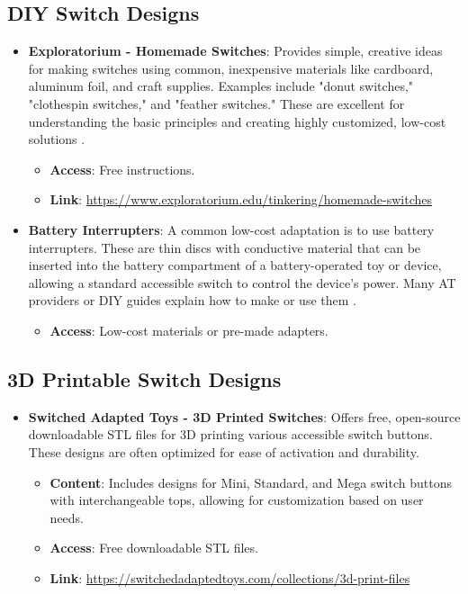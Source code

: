 \subsection{DIY Switch Designs}
\begin{itemize}
    \item \textbf{Exploratorium - Homemade Switches}: Provides simple, creative ideas for making switches using common, inexpensive materials like cardboard, aluminum foil, and craft supplies. Examples include "donut switches," "clothespin switches," and "feather switches." These are excellent for understanding the basic principles and creating highly customized, low-cost solutions  \cite{Exploratorium_Switches}.
    \begin{itemize}
        \item \textbf{Access}: Free instructions.
        \item \textbf{Link}: \url{https://www.exploratorium.edu/tinkering/homemade-switches}
    \end{itemize}
    \item \textbf{Battery Interrupters}: A common low-cost adaptation is to use battery interrupters. These are thin discs with conductive material that can be inserted into the battery compartment of a battery-operated toy or device, allowing a standard accessible switch to control the device's power. Many AT providers or DIY guides explain how to make or use them  \cite{ATKansans_Interrupters}.
    \begin{itemize}
        \item \textbf{Access}: Low-cost materials or pre-made adapters.
    \end{itemize}
\end{itemize}

\subsection{3D Printable Switch Designs}
\begin{itemize}
    \item \textbf{Switched Adapted Toys - 3D Printed Switches}: Offers free, open-source downloadable STL files for 3D printing various accessible switch buttons. These designs are often optimized for ease of activation and durability.
    \begin{itemize}
        \item \textbf{Content}: Includes designs for Mini, Standard, and Mega switch buttons with interchangeable tops, allowing for customization based on user needs.
        \item \textbf{Access}: Free downloadable STL files.
        \item \textbf{Link}: \url{https://switchedadaptedtoys.com/collections/3d-print-files}
    \end{itemize}
\end{itemize}

